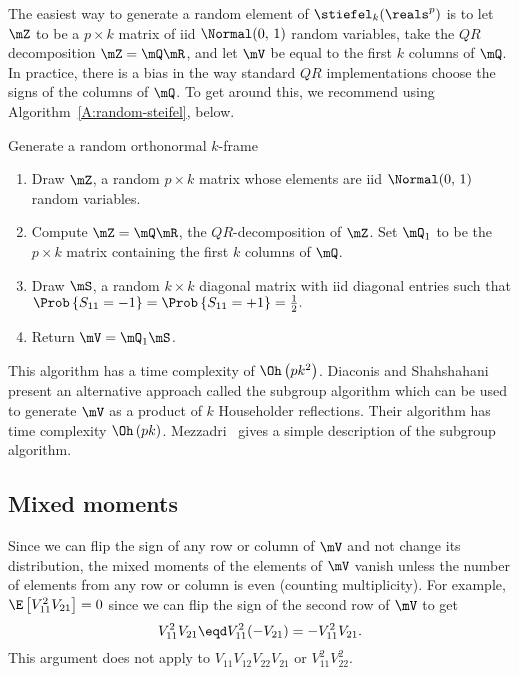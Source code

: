 The easiest way to generate a random element of $\stiefel_k(\reals^p)$ is
to let $\mZ$ to be a $p \times k$ matrix of iid $\Normal( 0, \, 1)$
random variables, take the $QR$ decomposition $\mZ = \mQ \mR$, and let
$\mV$ be equal to the first $k$ columns of $\mQ$.  In practice, there is
a bias in the way standard $QR$ implementations choose the signs of the
columns of $\mQ$.  To get around this, we recommend using 
Algorithm~\ref{A:random-steifel}, below.

\begin{algorithm}
    \caption{\label{A:random-steifel}Generate a random orthonormal $k$-frame}
    \begin{enumerate}
        \item Draw $\mZ$, a random $p \times k$ matrix whose elements are 
              iid $\Normal( 0, \, 1 )$ random variables.
              
        \item Compute $\mZ = \mQ \mR$, the $QR$-decomposition of $\mZ$.
              Set $\mQ_1$ to be the $p \times k$ matrix containing the
              first $k$ columns of $\mQ$.

        \item Draw $\mS$, a random $k \times k$ diagonal matrix with iid 
              diagonal entries such that 
              \(
                  \Prob\left\{ S_{11} = -1 \right\}
                  =
                  \Prob\left\{ S_{11} = +1 \right\}
                  =
                  \frac{1}{2}.
              \)
        \item Return $\mV = \mQ_1 \mS$.
    \end{enumerate}
\end{algorithm}

\noindent 
This algorithm has a time complexity of $\Oh\left( p k^2 \right)$. Diaconis
and Shahshahani~\cite{diaconis1987sag} present an alternative approach called
the subgroup algorithm which can be used to generate $\mV$ as a product of 
$k$ Householder reflections.  Their algorithm has time complexity 
$\Oh\left( p k \right)$.  Mezzadri~\cite{mezzadri2007grm} gives a simple 
description of the subgroup algorithm.


\subsection{Mixed moments}

Since we can flip the sign of any row or column of $\mV$ and not change
its distribution, the mixed moments of the elements of $\mV$ vanish unless 
the number of elements from any row or column is even (counting multiplicity).  For example, $\E \left[ V_{11}^2 V_{21} \right] = 0$ since we can flip the sign of the second row of $\mV$ to get
\[
    V_{11}^2 V_{21} 
    \eqd
    V_{11}^2 (- V_{21})
    =
    -V_{11}^2 V_{21}.
\]
This argument does not apply to $V_{11} V_{12} V_{22} V_{21}$ or
$V_{11}^2 V_{22}^2$.


